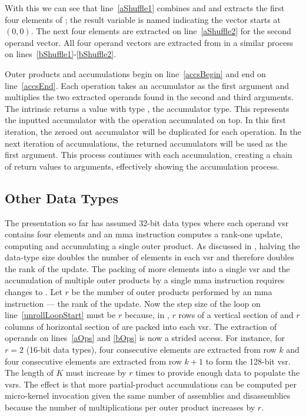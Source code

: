 \documentclass[\main/thesis.tex]{subfiles}
\begin{document}
With this we can see that line~\ref{aShuffle1} combines  and  and extracts the first four elements of ; the result variable is named  indicating the vector starts at $(0, 0)$.
The next four elements are extracted on line~\ref{aShuffle2} for the second operand vector.
All four operand vectors are extracted from  in a similar process on lines~\ref{bShuffle1}-\ref{bShuffle2}.

Outer products and accumulations begin on line~\ref{accsBegin} and end on line~\ref{accsEnd}.
Each operation takes an accumulator as the first argument and multiplies the two extracted operands found in the second and third arguments.
The  intrinsic returns a value with type , the accumulator type.
This represents the inputted accumulator with the operation accumulated on top.
In this first iteration, the zeroed out accumulator will be duplicated for each operation.
In the next iteration of accumulations, the returned accumulators will be used as the first argument.
This process continues with each accumulation, creating a chain of return values to arguments, effectively showing the accumulation process.

\subsection{Other Data Types}
\label{sec:dataTypes}
The presentation so far has assumed 32-bit data types where each operand \gls{vsr} contains four elements and an \gls{mma} instruction computes a rank-one update, computing and accumulating a single outer product.
As discussed in , halving the data-type size doubles the number of elements in each \gls{vsr} and therefore doubles the rank of the update.
The packing of more elements into a single \gls{vsr} and the accumulation of multiple outer products by a single \gls{mma} instruction requires changes to .
Let $r$ be the number of outer products performed by an \gls{mma} instruction --- \ie the rank of the update.
Now the step size of the loop on line~\ref{unrollLoopStart} must be $r$ because, in , $r$ rows of a vertical section of  and $r$ columns of horizontal section of  are packed into each \gls{vsr}.
The extraction of operands on lines~\ref{aOps} and \ref{bOps} is now a strided access.
For instance, for $r=2$ (16-bit data types), four consecutive elements are extracted from row $k$ and four consecutive elements are extracted from row $k+1$ to form the 128-bit \gls{vsr}.
The length of $K$ must increase by $r$ times to provide enough data to populate the \glspl{vsr}.
The effect is that more partial-product accumulations can be computed per micro-kernel invocation given the same number of assemblies and disassemblies because the number of multiplications per outer product increases by $r$.
\end{document}
